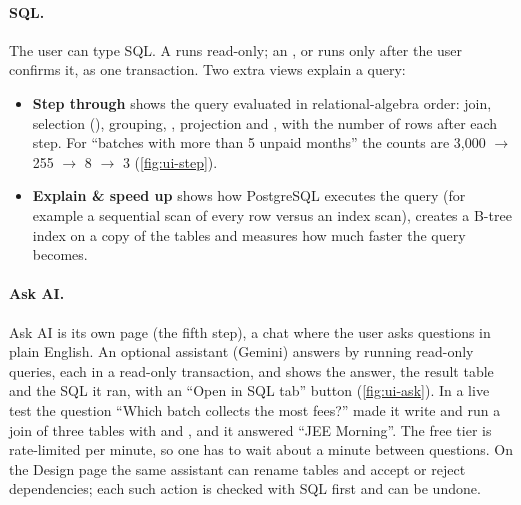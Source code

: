 \paragraph{SQL.} The user can type SQL. A  runs read-only; an ,  or
 runs only after the user confirms it, as one transaction. Two extra views explain a query:
\begin{itemize}
  \item \textbf{Step through} shows the query evaluated in relational-algebra order: join, selection
  (), grouping, , projection and , with the number of rows after
  each step. For ``batches with more than 5 unpaid months'' the counts are 3{,}000 $\rightarrow$ 255
  $\rightarrow$ 8 $\rightarrow$ 3 (\cref{fig:ui-step}).
  \item \textbf{Explain \& speed up} shows how PostgreSQL executes the query (for example a sequential scan
  of every row versus an index scan), creates a B-tree index on a copy of the tables and measures how much
  faster the query becomes.
\end{itemize}


\paragraph{Ask AI.} Ask AI is its own page (the fifth step), a chat where the user asks questions in plain
English. An optional assistant (Gemini) answers by running read-only  queries, each in a
read-only transaction, and shows the answer, the result table and the SQL it ran, with an ``Open in SQL
tab'' button (\cref{fig:ui-ask}). In a live test the question ``Which batch collects the most fees?'' made
it write and run a join of three tables with  and , and it answered ``JEE
Morning''. The free tier is rate-limited per minute, so one has to wait about a minute between questions.
On the Design page the same assistant can rename tables and accept or reject dependencies; each such action
is checked with SQL first and can be undone.



